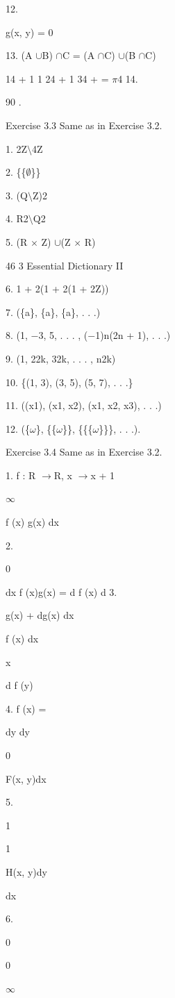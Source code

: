 \documentclass[11pt]{article}
\theoremstyle{plain}
\theoremstyle{definition}
\begin{document}
12.

g(x, y) = 0

13. (A $\cup$B) $\cap$C = (A $\cap$C) $\cup$(B $\cap$C)

14 + 1 1 24 + 1 34 + \textperiodcentered{} \textperiodcentered{} \textperiodcentered{} = $\pi$4 14.

90 .

Exercise 3.3 Same as in Exercise 3.2.

1. 2Z$\setminus$4Z

2. \{\{$\emptyset$\}\}

3. (Q$\setminus$Z)2

4. R2$\setminus$Q2

5. (R $\times$ Z) $\cup$(Z $\times$ R)

46 3 Essential Dictionary II

6. 1 + 2(1 + 2(1 + 2Z))

7. (\{a\}, \{a\}, \{a\}, . . .)

8. (1, $-$3, 5, . . . , ($-$1)n(2n + 1), . . .)

9. (1, 22k, 32k, . . . , n2k)

10. \{(1, 3), (3, 5), (5, 7), . . .\}

11. ((x1), (x1, x2), (x1, x2, x3), . . .)

12. (\{$\omega$\}, \{\{$\omega$\}\}, \{\{\{$\omega$\}\}\}, . . .).

Exercise 3.4 Same as in Exercise 3.2.

1. f : R $\to$R, x $\to$x + 1

$\infty$

f (x) g(x) dx

2.

0

dx f (x)g(x) = d f (x) d 3.

g(x) + dg(x) dx

f (x) dx

x

d f (y)

4. f (x) =

dy dy

0

F(x, y)dx

5.

1

1

H(x, y)dy

dx

6.

0

0

$\infty$
\end{document}
